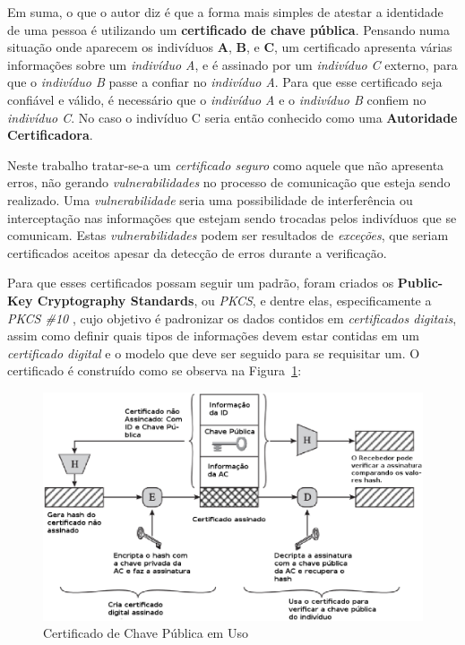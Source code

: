 	Em suma, o que o autor diz é que a forma mais simples de atestar a identidade de uma pessoa é utilizando um \textbf{certificado de chave pública}. Pensando numa situação onde aparecem os indivíduos \textbf{A}, \textbf{B}, e \textbf{C}, um certificado apresenta várias informações sobre um \textit{indivíduo A}, e é assinado por um \textit{indivíduo C} externo, para que o \textit{indivíduo B} passe a confiar no \textit{indivíduo A}. Para que esse certificado seja confiável e válido, é necessário que o \textit{indivíduo A} e o \textit{indivíduo B} confiem no \textit{indivíduo C}. No caso o indivíduo C seria então conhecido como uma \textbf{Autoridade Certificadora}.

	Neste trabalho tratar-se-a um \textit{certificado seguro} como aquele que não apresenta erros, não gerando \textit{vulnerabilidades} no processo de comunicação que esteja sendo realizado. Uma \textit{vulnerabilidade} seria uma possibilidade de interferência ou interceptação nas informações que estejam sendo trocadas pelos indivíduos que se comunicam. Estas \textit{vulnerabilidades} podem ser resultados de \textit{exceções}, que seriam certificados aceitos apesar da detecção de erros durante a verificação.

	Para que esses certificados possam seguir um padrão, foram criados os \textbf{Public-Key Cryptography Standards}, ou \textit{PKCS}, e dentre elas, especificamente a \textit{PKCS \#10} \cite{pkcs10}, cujo objetivo é padronizar os dados contidos em \textit{certificados digitais}, assim como definir quais tipos de informações devem estar contidas em um \textit{certificado digital} e o modelo que deve ser seguido para se requisitar um. O certificado é construído como se observa na Figura~\ref{fig:img06}:

	\begin{figure}[!ht]
		\centering
		\includegraphics[keepaspectratio=true,scale=0.46]{figuras/img05.eps}
		\caption{Certificado de Chave Pública em Uso \cite[p.~430]{stallings11}}
		\label{fig:img06}
	\end{figure}
 
